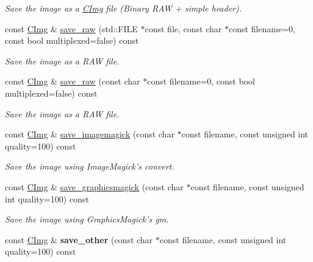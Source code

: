 \begin{DoxyCompactItemize}
\begin{DoxyCompactList}\small\item\em Save the image as a \hyperlink{structcimg__library_1_1_c_img}{CImg} file (Binary RAW + simple header). \item\end{DoxyCompactList}\item 
\hypertarget{structcimg__library_1_1_c_img_ae70ac83cf3ce759eb61133e84f2cea24}{
const \hyperlink{structcimg__library_1_1_c_img}{CImg} \& \hyperlink{structcimg__library_1_1_c_img_ae70ac83cf3ce759eb61133e84f2cea24}{save\_\-raw} (std::FILE $\ast$const file, const char $\ast$const filename=0, const bool multiplexed=false) const }
\label{structcimg__library_1_1_c_img_ae70ac83cf3ce759eb61133e84f2cea24}

\begin{DoxyCompactList}\small\item\em Save the image as a RAW file. \item\end{DoxyCompactList}\item 
\hypertarget{structcimg__library_1_1_c_img_acd6ec0c7c53733bef57bca68651c8394}{
const \hyperlink{structcimg__library_1_1_c_img}{CImg} \& \hyperlink{structcimg__library_1_1_c_img_acd6ec0c7c53733bef57bca68651c8394}{save\_\-raw} (const char $\ast$const filename=0, const bool multiplexed=false) const }
\label{structcimg__library_1_1_c_img_acd6ec0c7c53733bef57bca68651c8394}

\begin{DoxyCompactList}\small\item\em Save the image as a RAW file. \item\end{DoxyCompactList}\item 
const \hyperlink{structcimg__library_1_1_c_img}{CImg} \& \hyperlink{structcimg__library_1_1_c_img_a6414cc4030892b8ae825a274dec26ab8}{save\_\-imagemagick} (const char $\ast$const filename, const unsigned int quality=100) const 
\begin{DoxyCompactList}\small\item\em Save the image using ImageMagick's convert. \item\end{DoxyCompactList}\item 
const \hyperlink{structcimg__library_1_1_c_img}{CImg} \& \hyperlink{structcimg__library_1_1_c_img_acd56ecc64c775ee50dfedc4ef9855ab3}{save\_\-graphicsmagick} (const char $\ast$const filename, const unsigned int quality=100) const 
\begin{DoxyCompactList}\small\item\em Save the image using GraphicsMagick's gm. \item\end{DoxyCompactList}\item 
\hypertarget{structcimg__library_1_1_c_img_ad2d72f85340d7c859c8cd7a52621756b}{
const \hyperlink{structcimg__library_1_1_c_img}{CImg} \& {\bfseries save\_\-other} (const char $\ast$const filename, const unsigned int quality=100) const }
\label{structcimg__library_1_1_c_img_ad2d72f85340d7c859c8cd7a52621756b}


\end{DoxyCompactItemize}
